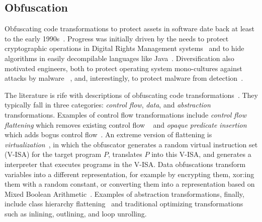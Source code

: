 \subsection{Obfuscation}
Obfuscating code transformations to protect assets in software date back at least to the early 1990s~\cite{falcarin2011guest}. Progress was initially driven by the needs to protect cryptographic operations in Digital Rights Management systems~\cite{horning05softwarea,chow02white-box} and to hide algorithms in easily decompilable languages like Java~\cite{collberg1997taxonomy}. Diversification also motivated engineers, both to protect operating system mono-cultures against attacks by malware~
\cite{cohen93operating}, and, interestingly, to protect malware from detection~\cite{Skulason92mutation}. 

The literature is rife with descriptions of obfuscating code transformations~\cite{collberg_surreptitious_2010}. They typically fall in three categories: {\em control flow}, {\em data}, and {\em abstraction} transformations. Examples of control flow transformations include {\em control flow flattening} which removes existing control flow ~\cite{wang00security} and {\em opaque predicate insertion} which adds bogus control flow~\cite{collberg1997taxonomy}. An extreme version of flattening is {\em virtualization}~\cite{yadegari15generic}, in which the obfuscator generates a random virtual instruction set (V-ISA) for the target program $P$, translates $P$ into this V-ISA, and generates a interpreter that executes programs in the V-ISA. Data obfuscations transform variables into a different representation, for example by encrypting them, xor:ing them with a random constant, or converting them into a representation based on Mixed Boolean Arithmetic~\cite{Zhou:2007:IHS:1784964.1784971}. Examples of abstraction transformations, finally, include class hierarchy flattening~\cite{FPS12b} and traditional optimizing transformations such as inlining, outlining, and loop unrolling.



